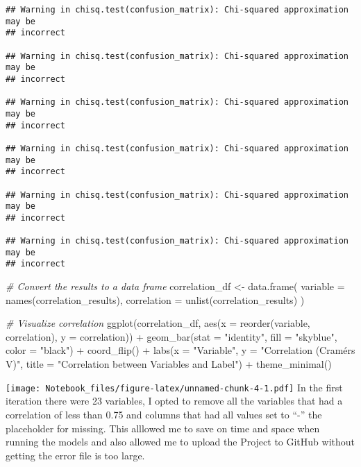 \documentclass[
]{article}
\newenvironment{Shaded}{\begin{snugshade}}{\end{snugshade}}
\newcommand{\AttributeTok}[1]{\textcolor[rgb]{0.77,0.63,0.00}{#1}}
\newcommand{\CommentTok}[1]{\textcolor[rgb]{0.56,0.35,0.01}{\textit{#1}}}
\newcommand{\FunctionTok}[1]{\textcolor[rgb]{0.00,0.00,0.00}{#1}}
\newcommand{\NormalTok}[1]{#1}
\newcommand{\OtherTok}[1]{\textcolor[rgb]{0.56,0.35,0.01}{#1}}
\newcommand{\SpecialCharTok}[1]{\textcolor[rgb]{0.00,0.00,0.00}{#1}}
\newcommand{\StringTok}[1]{\textcolor[rgb]{0.31,0.60,0.02}{#1}}
\begin{document}
\begin{verbatim}
## Warning in chisq.test(confusion_matrix): Chi-squared approximation may be
## incorrect

## Warning in chisq.test(confusion_matrix): Chi-squared approximation may be
## incorrect

## Warning in chisq.test(confusion_matrix): Chi-squared approximation may be
## incorrect

## Warning in chisq.test(confusion_matrix): Chi-squared approximation may be
## incorrect

## Warning in chisq.test(confusion_matrix): Chi-squared approximation may be
## incorrect

## Warning in chisq.test(confusion_matrix): Chi-squared approximation may be
## incorrect
\end{verbatim}

\begin{Shaded}
\begin{Highlighting}[]
\CommentTok{\# Convert the results to a data frame}
\NormalTok{correlation\_df }\OtherTok{\textless{}{-}} \FunctionTok{data.frame}\NormalTok{(}
  \AttributeTok{variable =} \FunctionTok{names}\NormalTok{(correlation\_results),}
  \AttributeTok{correlation =} \FunctionTok{unlist}\NormalTok{(correlation\_results)}
\NormalTok{)}

\CommentTok{\# Visualize correlation}
\FunctionTok{ggplot}\NormalTok{(correlation\_df, }\FunctionTok{aes}\NormalTok{(}\AttributeTok{x =} \FunctionTok{reorder}\NormalTok{(variable, correlation), }\AttributeTok{y =}\NormalTok{ correlation)) }\SpecialCharTok{+}
  \FunctionTok{geom\_bar}\NormalTok{(}\AttributeTok{stat =} \StringTok{"identity"}\NormalTok{, }\AttributeTok{fill =} \StringTok{"skyblue"}\NormalTok{, }\AttributeTok{color =} \StringTok{"black"}\NormalTok{) }\SpecialCharTok{+}
  \FunctionTok{coord\_flip}\NormalTok{() }\SpecialCharTok{+}
  \FunctionTok{labs}\NormalTok{(}\AttributeTok{x =} \StringTok{"Variable"}\NormalTok{, }\AttributeTok{y =} \StringTok{"Correlation (Cramér\textquotesingle{}s V)"}\NormalTok{,}
       \AttributeTok{title =} \StringTok{"Correlation between Variables and Label"}\NormalTok{) }\SpecialCharTok{+}
  \FunctionTok{theme\_minimal}\NormalTok{()}
\end{Highlighting}
\end{Shaded}

\texttt{[image: Notebook\_files/figure-latex/unnamed-chunk-4-1.pdf]} In
the first iteration there were 23 variables, I opted to remove all the
variables that had a correlation of less than 0.75 and columns that had
all values set to ``-'' the placeholder for missing. This alllowed me to
save on time and space when running the models and also allowed me to
upload the Project to GitHub without getting the error file is too
large.
\end{document}
